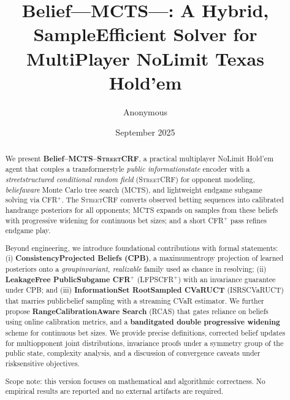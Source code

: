 \documentclass[10pt]{article}
\title{Belief---MCTS---\sCRF: A Hybrid, Sample\textendash Efficient Solver for Multi\textendash Player No\textendash Limit Texas Hold'em}
\author{Anonymous}
\date{September 2025}
\newcommand{\sCRF}{\textsc{Street\textendash CRF}\xspace}
\newcommand{\1}{\mathbf{1}}
\theoremstyle{plain}
\begin{document}
\maketitle

\begin{abstract}
We present \textbf{Belief--MCTS--\sCRF}, a practical multi\textendash player No\textendash Limit Hold'em agent that couples a transformer\textendash style \emph{public information\textendash state} encoder with a \emph{street\textendash structured conditional random field} (\sCRF) for opponent modeling, \emph{belief\textendash aware} Monte Carlo tree search (MCTS), and lightweight endgame subgame solving via CFR$^+$. The \sCRF converts observed betting sequences into calibrated hand\textendash range posteriors for all opponents; MCTS expands on samples from these beliefs with progressive widening for continuous bet sizes; and a short CFR$^+$ pass refines endgame play. 

Beyond engineering, we introduce foundational contributions with formal statements: (i) \textbf{Consistency\textendash Projected Beliefs (CPB)}, a maximum\textendash entropy projection of learned posteriors onto a \emph{group\textendash invariant, realizable} family used as chance in re\textendash solving; (ii) \textbf{Leakage\textendash Free Public\textendash Subgame CFR$^+$} (LF\textendash PS\textendash CFR$^+$) with an invariance guarantee under CPB; and (iii) \textbf{Information\textendash Set Root\textendash Sampled CVaR\textendash UCT} (IS\textendash RS\textendash CVaR\textendash UCT) that marries public\textendash belief sampling with a streaming CVaR estimator. We further propose \textbf{Range\textendash Calibration\textendash Aware Search} (RCAS) that gates reliance on beliefs using online calibration metrics, and a \textbf{bandit\textendash gated double progressive widening} scheme for continuous bet sizes. We provide precise definitions, corrected belief updates for multi\textendash opponent joint distributions, invariance proofs under a symmetry group of the public state, complexity analysis, and a discussion of convergence caveats under risk\textendash sensitive objectives.

Scope note: this version focuses on mathematical and algorithmic correctness. No empirical results are reported and no external artifacts are required.
\end{abstract}
\end{document}
